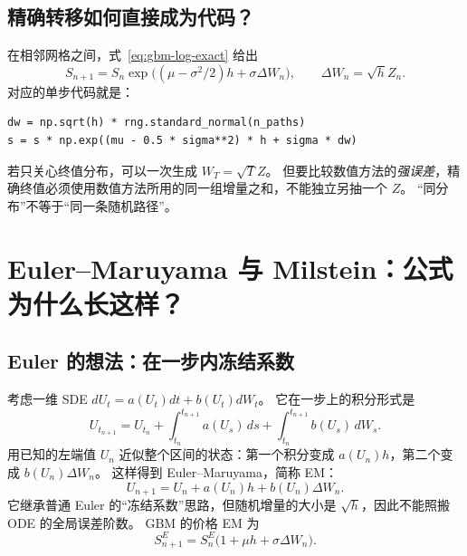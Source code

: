 \subsection{精确转移如何直接成为代码？}
在相邻网格之间，式~\eqref{eq:gbm-log-exact} 给出
\begin{equation}\label{eq:gbm-transition}
 S_{n+1}=S_n\exp\bigl((\mu-\sigma^2/2)h+\sigma\Delta W_n\bigr),\qquad
 \Delta W_n=\sqrt h Z_n.
\end{equation}
对应的单步代码就是：
\begin{lstlisting}
dw = np.sqrt(h) * rng.standard_normal(n_paths)
s = s * np.exp((mu - 0.5 * sigma**2) * h + sigma * dw)
\end{lstlisting}
若只关心终值分布，可以一次生成 $W_T=\sqrt T Z$。
但要比较数值方法的\emph{强误差}，精确终值必须使用数值方法所用的同一组增量之和，不能独立另抽一个 $Z$。
“同分布”不等于“同一条随机路径”。

\section{Euler--Maruyama 与 Milstein：公式为什么长这样？}\label{sec:methods}
\subsection{Euler 的想法：在一步内冻结系数}
考虑一维 SDE $dU_t=a(U_t)dt+b(U_t)dW_t$。
它在一步上的积分形式是
\begin{equation}\label{eq:methods-integral}
 U_{t_{n+1}}=U_{t_n}+\int_{t_n}^{t_{n+1}}a(U_s)\,ds+
 \int_{t_n}^{t_{n+1}}b(U_s)\,dW_s.
\end{equation}
用已知的左端值 $U_n$ 近似整个区间的状态：第一个积分变成 $a(U_n)h$，第二个变成 $b(U_n)\Delta W_n$。
这样得到 Euler--Maruyama，简称 EM：
\begin{equation}\label{eq:methods-em-general}
 U_{n+1}=U_n+a(U_n)h+b(U_n)\Delta W_n.
\end{equation}
它继承普通 Euler 的“冻结系数”思路，但随机增量的大小是 $\sqrt h$，因此不能照搬 ODE 的全局误差阶数。
GBM 的价格 EM 为
\begin{equation}\label{eq:methods-em-gbm}
 S_{n+1}^{E}=S_n^{E}\bigl(1+\mu h+\sigma\Delta W_n\bigr).
\end{equation}

